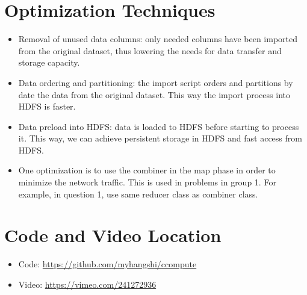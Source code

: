 \documentclass[fontsize=11pt,paper=a4]{scrartcl}
\begin{document}
\section{Optimization Techniques}
\begin{itemize}
\item Removal of unused data columns: only needed columns have been imported from the original dataset, thus lowering the needs for data transfer and storage capacity.
\item Data ordering and partitioning: the import script orders and partitions by date the data from the original dataset. This way the import process into HDFS is faster.
\item Data preload into HDFS: data  is loaded to HDFS before starting to process it. This way, we can achieve persistent storage in HDFS and fast access from HDFS.
\item One optimization is to use the combiner in the map phase in order to minimize the network traffic. This is used in problems in group 1. For example, in question 1, use same reducer class as combiner class. 

\end{itemize} 
 
\section{Code and Video Location}
\begin{itemize}
\item Code:    \url{https://github.com/myhangshi/ccompute}
\item Video:   \url{https://vimeo.com/241272936}
\end{itemize} 
 
\end{document}
